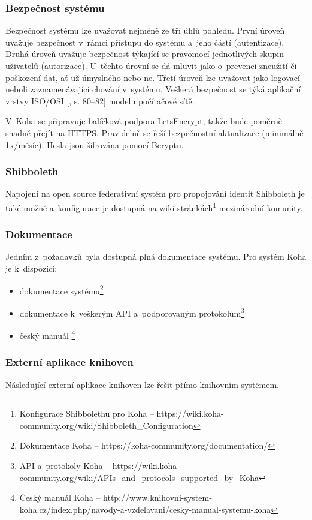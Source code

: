 \documentclass[
	11pt, oneside, printed, final, palatino
	microtype,
	table,   %
	lof,     %
	lot     %
]{fithesis3}
\newcommand{\citepages}[2]{[\cite{#2}, s. #1]}
\begin{document}
{\subsubsection{{\large Bezpečnost systému}}
Bezpečnost systému lze uvažovat nejméně ze tří úhlů pohledu. První úroveň uvažuje bezpečnost v~rámci přístupu do systému a~jeho částí (autentizace). Druhá úroveň uvažuje bezpečnost týkající se pravomocí jednotlivých skupin uživatelů (autorizace). U~těchto úrovní se dá mluvit jako o~prevenci zneužití či poškození dat, ať už úmyslného nebo ne. Třetí úroveň lze uvažovat jako logovací neboli zaznamenávající chování v~systému. Veškerá bezpečnost se týká aplikační vrstvy ISO/OSI \citepages{80–82}{kurose_ross_2014} modelu počítačové sítě.

V~Koha se připravuje balíčková podpora LetsEncrypt, takže bude poměrně snadné přejít na HTTPS. Pravidelně se řeší bezpečnostní aktualizace (minimálně 1x/měsíc). Hesla jsou šifrována pomocí Bcryptu.

\subsubsection{{\large Shibboleth}}
Napojení na open source federativní systém pro propojování identit Shibboleth je také možné a~konfigurace je dostupná na wiki stránkách\footnote{Konfigurace Shibbolethu pro Koha – https://wiki.koha-community.org/wiki/Shibboleth\_Configuration} mezinárodní komunity.

\subsubsection{{\large Dokumentace}}
Jedním z~požadavků byla dostupná plná dokumentace systému. Pro systém Koha je k~dispozici:

\begin{itemize}
\item dokumentace systému\footnote{Dokumentace Koha – https://koha-community.org/documentation/}
\item dokumentace k~veškerým API a~podporovaným protokolům\footnote{API a~protokoly Koha – \url{https://wiki.koha-community.org/wiki/APIs\_and\_protocols\_supported\_by\_Koha}}
\item český manuál \footnote{Český manuál Koha – http://www.knihovni-system-koha.cz/index.php/navody-a-vzdelavani/cesky-manual-systemu-koha}
\end{itemize}

\subsubsection{{\large Externí aplikace knihoven}}
Následující externí aplikace knihoven lze řešit přímo knihovním systémem.

}
\end{document}
